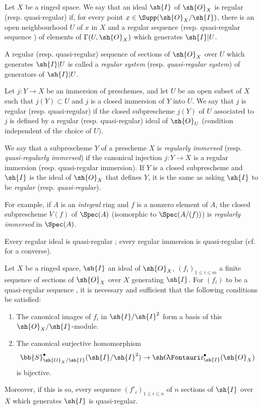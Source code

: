 \begin{definition}[16.9.1]
\label{IV.16.9.1}
Let $X$ be a ringed space.
We say that an ideal $\sh{I}$ of $\sh{O}_X$ is regular (resp. quasi-regular) if, for every point $x \in \Supp(\sh{O}_X/\sh{I})$, there is an open neighbourhood $U$ of $x$ in $X$ and a regular sequence  (resp. quasi-regular sequence ) of elements of $\Gamma(U, \sh{O}_X)$ which generates $\sh{I}|U$.
\end{definition}

A regular (resp. quasi-regular) sequence of sections of $\sh{O}_X$ over $U$ which generates $\sh{I}|U$ is called a \emph{regular system} (resp. \emph{quasi-regular system}) of generators of $\sh{I}|U$.

\begin{definition}[16.9.2]
\label{IV.16.9.2}
Let $j: Y \to X$ be an immersion of preschemes, and let $U$ be an open subset of $X$ such that $j(Y) \subset U$ and $j$ is a closed immersion of $Y$ into $U$.
We say that $j$ is regular (resp. quasi-regular) if the closed subprescheme $j(Y)$ of $U$ associated to $j$ is defined by a regular (resp. quasi-regular) ideal of $\sh{O}_U$ (condition independent of the choice of $U$).
\end{definition}

We say that a subprescheme $Y$ of a prescheme $X$ is \emph{regularly immersed} (resp. \emph{quasi-regularly immersed}) if the canonical injection $j:Y \to X$ is a regular immersion (resp. quasi-regular immersion). 
If $Y$ is a closed subprescheme and $\sh{I}$ is the ideal of $\sh{O}_X$ that defines $Y$, it is the same as asking $\sh{I}$ to be \emph{regular} (resp. \emph{quasi-regular}).

For example, if $A$ is an \emph{integral} ring and $f$ is a nonzero element of $A$, the closed subprescheme $V(f)$ of $\Spec(A)$ (isomorphic to $\Spec(A/(f))$) is \emph{regularly immersed} in $\Spec(A)$.

Every regular ideal is quasi-regular ;
every regular immersion is quasi-regular (cf.  for a converse).  

\begin{proposition}[16.9.3]
\label{IV.16.9.3}
Let $X$ be a ringed space, $\sh{I}$ an ideal of $\sh{O}_X$, $(f_i)_{1 \leq i \leq m}$ a finite sequence of sections of $\sh{O}_X$ over $X$ generating $\sh{I}$.
For $(f_i)$ to be a quasi-regular sequence , it is necessary and sufficient that the following conditions be satisfied:
\begin{enumerate}
  \item[\rm{(i)}] The canonical images of $f_i$ in $\sh{I}/\sh{I}^2$ form a basis of this $\sh{O}_X/\sh{I}$-module.
  \item[\rm{(ii)}] The canonical surjective homomorphism 
  \[
    \bb{S}_{\sh{O}_X/\sh{I}}^\bullet (\sh{I}/\sh{I}^2) \to \shGr_{\sh{I}}^\bullet(\sh{O}_X) 
  \]
  is bijective.
\end{enumerate}

Moreover, if this is so, every sequence $(f'_i)_{1 \leq i \leq n}$ of $n$ sections of $\sh{I}$ over $X$ which generates $\sh{I}$ is quasi-regular.
\end{proposition}

